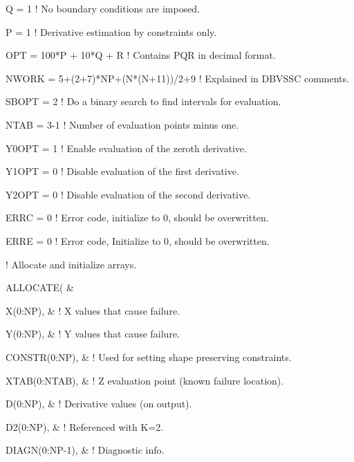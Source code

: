 {\item{}   Q = 1 \textMaroon ! No boundary conditions are imposed. \textBlack
\item{}   P = 1 \textMaroon ! Derivative estimation by constraints only. \textBlack
\item{}   OPT = 100*P + 10*Q + R \textMaroon ! Contains PQR in decimal format. \textBlack
\item{}   NWORK = 5+(2+7)*NP+(N*(N+11))/2+9 \textMaroon ! Explained in DBVSSC comments. \textBlack
\item{}   SBOPT = 2 \textMaroon ! Do a binary search to find intervals for evaluation. \textBlack
\item{}   NTAB = 3-1 \textMaroon ! Number of evaluation points minus one. \textBlack
\item{}   Y0OPT = 1 \textMaroon ! Enable evaluation of the zeroth derivative. \textBlack
\item{}   Y1OPT = 0 \textMaroon ! Disable evaluation of the first derivative. \textBlack
\item{}   Y2OPT = 0 \textMaroon ! Disable evaluation of the second derivative. \textBlack
\item{}   ERRC = 0 \textMaroon ! Error code, initialize to 0, should be overwritten. \textBlack
\item{}   ERRE = 0 \textMaroon ! Error code, Initialize to 0, should be overwritten. \textBlack
\item{}   \textMaroon ! Allocate and initialize arrays. \textBlack
\item{}   \textCyan ALLOCATE\textBlack( \textCyan\&\textBlack $ $
\item{}   \hskip 10mm X(0:NP), \textCyan\& \textBlack \textMaroon ! X values that cause failure. \textBlack $ $
\item{}   \hskip 10mm Y(0:NP), \textCyan\& \textBlack \textMaroon ! Y values that cause failure. \textBlack $ $
\item{}   \hskip 10mm CONSTR(0:NP), \textCyan\& \textBlack \textMaroon ! Used for setting shape preserving constraints. \textBlack $ $
\item{}   \hskip 10mm XTAB(0:NTAB), \textCyan\& \textBlack \textMaroon ! Z evaluation point (known failure location). \textBlack $ $
\item{}   \hskip 10mm D(0:NP), \textCyan\& \textBlack \textMaroon ! Derivative values (on output). \textBlack $ $
\item{}   \hskip 10mm D2(0:NP), \textCyan\& \textBlack \textMaroon ! Referenced with K=2. \textBlack $ $
\item{}   \hskip 10mm DIAGN(0:NP-1), \textCyan\& \textBlack \textMaroon ! Diagnostic info. \textBlack $ $
}
